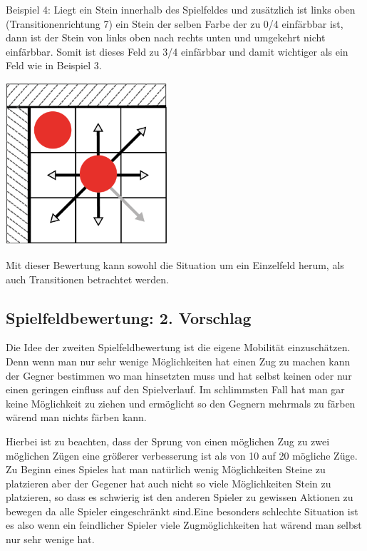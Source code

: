 \documentclass[12pt,a4paper,bibliography=totocnumbered,listof=totocnumbered]{scrartcl}
\begin{document}
    Beispiel 4: Liegt ein Stein innerhalb des Spielfeldes und zusätzlich ist links oben (Transitionenrichtung 7) ein Stein der selben Farbe der zu 0/4 einfärbbar ist, dann ist der Stein von links oben nach rechts unten und umgekehrt nicht einfärbbar. Somit ist dieses Feld zu 3/4 einfärbbar und damit wichtiger als ein Feld wie in Beispiel 3.\newline

    \includegraphics[width=6cm]{pics/Kapitel_3/Kapitel_3_pic4.png}

    Mit dieser Bewertung kann sowohl die Situation um ein Einzelfeld herum, als auch Transitionen betrachtet werden.

    \subsection{Spielfeldbewertung: 2. Vorschlag}
    \vspace{1em}
    Die Idee der zweiten Spielfeldbewertung ist die eigene Mobilität einzuschätzen. Denn wenn man nur sehr wenige Möglichkeiten hat einen Zug zu machen kann der Gegner bestimmen wo man hinsetzten muss und hat selbst keinen oder nur einen geringen einfluss auf den Spielverlauf. Im schlimmsten Fall hat man gar keine Möglichkeit zu ziehen und ermöglicht so den Gegnern mehrmals zu färben wärend man nichts färben kann.

    Hierbei ist zu beachten, dass der Sprung von einen möglichen Zug zu zwei möglichen Zügen eine größerer verbesserung ist als von 10 auf 20 mögliche Züge.
    Zu Beginn eines Spieles hat man natürlich wenig Möglichkeiten Steine zu platzieren aber der Gegener hat auch nicht so viele Möglichkeiten Stein zu platzieren, so dass es schwierig ist den anderen Spieler zu gewissen Aktionen zu bewegen da alle Spieler eingeschränkt sind.Eine besonders schlechte Situation ist es also wenn ein feindlicher Spieler viele Zugmöglichkeiten hat wärend man selbst nur sehr wenige hat.
\end{document}
